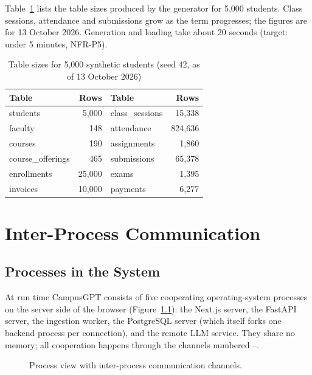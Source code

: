 \documentclass[11pt,a4paper,oneside]{report}
\begin{document}
Table~\ref{tab:sizes} lists the table sizes produced by the generator for 5,000 students.
Class sessions, attendance and submissions grow as the term progresses; the figures are for
13 October 2026. Generation and loading take about 20 seconds (target: under 5 minutes,
NFR-P5).

\begin{table}[H]
\centering
\caption{Table sizes for 5,000 synthetic students (seed 42, as of 13 October 2026)}
\label{tab:sizes}
\begin{tabular}{@{}lrlr@{}}
\toprule
\textbf{Table} & \textbf{Rows} & \textbf{Table} & \textbf{Rows}\\
\midrule
students        & 5,000     & class\_sessions & 15,338\\
faculty         & 148       & attendance      & 824,636\\
courses         & 190       & assignments     & 1,860\\
course\_offerings & 465     & submissions     & 65,378\\
enrollments     & 25,000    & exams           & 1,395\\
invoices        & 10,000    & payments        & 6,277\\
\bottomrule
\end{tabular}
\end{table}

\chapter{Inter-Process Communication}
\label{ch:ipc}

\section{Processes in the System}
At run time CampusGPT consists of five cooperating operating-system processes on the
server side of the browser (Figure~\ref{fig:proc}): the Next.js server, the FastAPI server,
the ingestion worker, the PostgreSQL server (which itself forks one backend process per
connection), and the remote LLM service. They share no memory; all cooperation happens
through the channels numbered --.

\begin{figure}[H]
\centering
\resizebox{\textwidth}{!}{}
\caption{Process view with inter-process communication channels.}
\label{fig:proc}
\end{figure}
\end{document}

